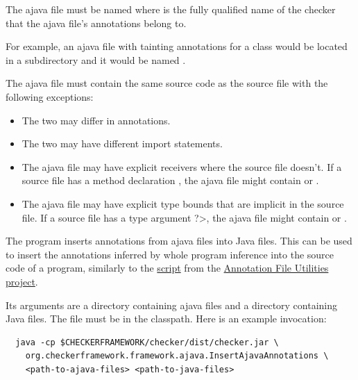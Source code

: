 The ajava file must be named
 where
 is the fully qualified name of the checker that
the ajava file's annotations belong to.

For example, an ajava file with
tainting annotations for a class  would
be located in a subdirectory  and it would be
named
.



The
ajava file must contain the same source code as the source file with the following exceptions:
\begin{itemize}
  \item The two may differ in annotations.
  \item The two may have different import statements.
  \item The ajava file may have explicit receivers where the source file
    doesn't. If a source file has a method declaration , the ajava file might contain  or .
  \item The ajava file may have explicit type bounds that are implicit in the source file.
    If a source file has a type argument \<?>,
    the ajava file might contain  or .
\end{itemize}



The  program inserts annotations
from ajava files into Java files.  This can be used to
insert the annotations inferred by whole program inference into the source code
of a program, similarly to the
\href{https://eisop.github.io/afu/#insert-annotations-to-source}{
  script} from the
\href{https://eisop.github.io/afu/}{Annotation
  File Utilities project}.

Its arguments are a directory containing ajava files and a directory
containing Java files.  The  file must be in the classpath.
Here is an example invocation:
\begin{Verbatim}
  java -cp $CHECKERFRAMEWORK/checker/dist/checker.jar \
    org.checkerframework.framework.ajava.InsertAjavaAnnotations \
    <path-to-ajava-files> <path-to-java-files>
\end{Verbatim}


